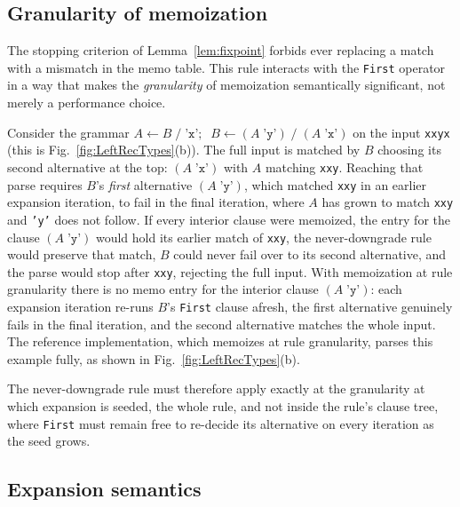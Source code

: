 \documentclass[manuscript]{acmart}
\newcommand{\cd}[1]{\texttt{#1}}
\begin{document}
\subsection{Granularity of memoization}
\label{sec:granularity}

The stopping criterion of Lemma~\ref{lem:fixpoint} forbids ever replacing a match with a mismatch in the memo table. This rule interacts with the \cd{First} operator in a way that makes the \emph{granularity} of memoization semantically significant, not merely a performance choice.

Consider the grammar $A \leftarrow B \; / \; \texttt{'x'}; \;\; B \leftarrow (A \; \texttt{'y'}) \; / \; (A \; \texttt{'x'})$ on the input \cd{xxyx} (this is Fig.~\ref{fig:LeftRecTypes}(b)). The full input is matched by $B$ choosing its second alternative at the top: $(A \; \texttt{'x'})$ with $A$ matching \cd{xxy}. Reaching that parse requires $B$'s \emph{first} alternative $(A \; \texttt{'y'})$, which matched \cd{xxy} in an earlier expansion iteration, to fail in the final iteration, where $A$ has grown to match \cd{xxy} and \cd{'y'} does not follow. If every interior clause were memoized, the entry for the clause $(A \; \texttt{'y'})$ would hold its earlier match of \cd{xxy}, the never-downgrade rule would preserve that match, $B$ could never fail over to its second alternative, and the parse would stop after \cd{xxy}, rejecting the full input. With memoization at rule granularity there is no memo entry for the interior clause $(A \; \texttt{'y'})$: each expansion iteration re-runs $B$'s \cd{First} clause afresh, the first alternative genuinely fails in the final iteration, and the second alternative matches the whole input. The reference implementation, which memoizes at rule granularity, parses this example fully, as shown in Fig.~\ref{fig:LeftRecTypes}(b).

The never-downgrade rule must therefore apply exactly at the granularity at which expansion is seeded, the whole rule, and not inside the rule's clause tree, where \cd{First} must remain free to re-decide its alternative on every iteration as the seed grows.

\subsection{Expansion semantics}
\label{sec:semantics}
\end{document}
